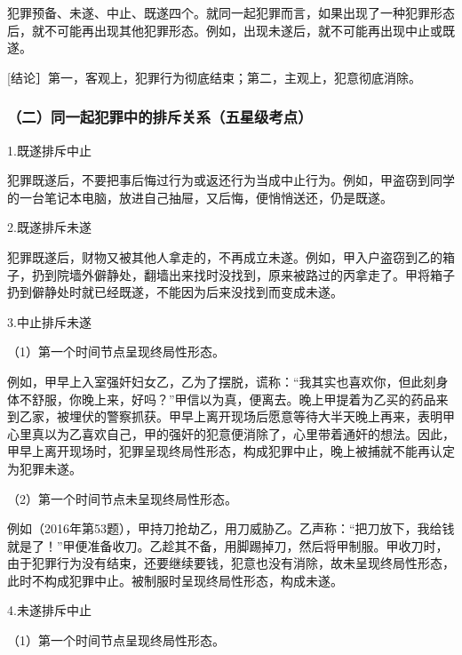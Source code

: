 犯罪预备、未遂、中止、既遂四个。就同一起犯罪而言，如果出现了一种犯罪形态后，就不可能再出现其他犯罪形态。例如，出现未遂后，就不可能再出现中止或既遂。

[结论］第一，客观上，犯罪行为彻底结束；第二，主观上，犯意彻底消除。

\subsubsection*{（二）同一起犯罪中的排斥关系（五星级考点）}

1.既遂排斥中止

犯罪既遂后，不要把事后悔过行为或返还行为当成中止行为。例如，甲盗窃到同学的一台笔记本电脑，放进自己抽屉，又后悔，便悄悄送还，仍是既遂。

2.既遂排斥未遂

犯罪既遂后，财物又被其他人拿走的，不再成立未遂。例如，甲入户盗窃到乙的箱子，扔到院墙外僻静处，翻墙出来找时没找到，原来被路过的丙拿走了。甲将箱子扔到僻静处时就已经既遂，不能因为后来没找到而变成未遂。

3.中止排斥未遂

（1）第一个时间节点呈现终局性形态。

例如，甲早上入室强奸妇女乙，乙为了摆脱，谎称：“我其实也喜欢你，但此刻身体不舒服，你晚上来，好吗？”甲信以为真，便离去。晚上甲提着为乙买的药品来到乙家，被埋伏的警察抓获。甲早上离开现场后愿意等待大半天晚上再来，表明甲心里真以为乙喜欢自己，甲的强奸的犯意便消除了，心里带着通奸的想法。因此，甲早上离开现场时，犯罪呈现终局性形态，构成犯罪中止，晚上被捕就不能再认定为犯罪未遂。

（2）第一个时间节点未呈现终局性形态。

例如（2016年第53题），甲持刀抢劫乙，用刀威胁乙。乙声称：“把刀放下，我给钱就是了！”甲便准备收刀。乙趁其不备，用脚踢掉刀，然后将甲制服。甲收刀时，由于犯罪行为没有结束，还要继续要钱，犯意也没有消除，故未呈现终局性形态，此时不构成犯罪中止。被制服时呈现终局性形态，构成未遂。

4.未遂排斥中止

（1）第一个时间节点呈现终局性形态。

